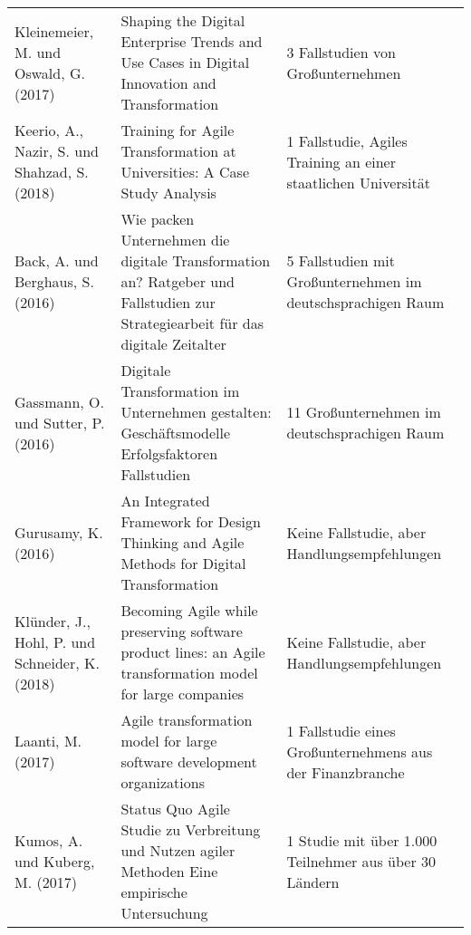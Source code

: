 \begin{table}[ht]
\begin{tabularx}{500px}{|X|X|X|}
		Kleinemeier, M. und Oswald, G. (2017)               & Shaping the Digital Enterprise Trends and Use Cases in Digital Innovation and Transformation                                                  & 3 Fallstudien von Großunternehmen                                                                           \\
		Keerio, A., Nazir, S. und Shahzad, S. (2018)        & Training for Agile Transformation at Universities: A Case Study Analysis                                                                      & 1 Fallstudie, Agiles Training an einer staatlichen Universität                                              \\
		Back, A. und Berghaus, S. (2016)                    & Wie packen Unternehmen die digitale Transformation an? Ratgeber und Fallstudien zur Strategiearbeit für das digitale Zeitalter                & 5 Fallstudien mit Großunternehmen im deutschsprachigen Raum                                                 \\
		Gassmann, O. und Sutter, P. (2016)                  & Digitale Transformation im Unternehmen gestalten: Geschäftsmodelle Erfolgsfaktoren Fallstudien                                                & 11 Großunternehmen im deutschsprachigen Raum                                                                \\
		Gurusamy, K. (2016)                                 & An Integrated Framework for Design Thinking and Agile Methods for Digital Transformation                                                      & Keine Fallstudie, aber Handlungsempfehlungen                                                                \\
		Klünder, J., Hohl, P. und Schneider, K. (2018)      & Becoming Agile while preserving software product lines: an Agile transformation model for large companies                                     & Keine Fallstudie, aber Handlungsempfehlungen                                                                \\
		Laanti, M. (2017)                                   & Agile transformation model for large software development organizations                                                                       & 1 Fallstudie eines Großunternehmens aus der Finanzbranche                                                   \\
		Kumos, A. und Kuberg, M. (2017)                     & Status Quo Agile Studie zu Verbreitung und Nutzen agiler Methoden Eine empirische Untersuchung                                                & 1 Studie mit über 1.000 Teilnehmer aus über 30 Ländern                                                    \\
		\hline                                                                                          
	\end{tabularx}
	\label{tab:overviewliterature2-2}
\end{table}

